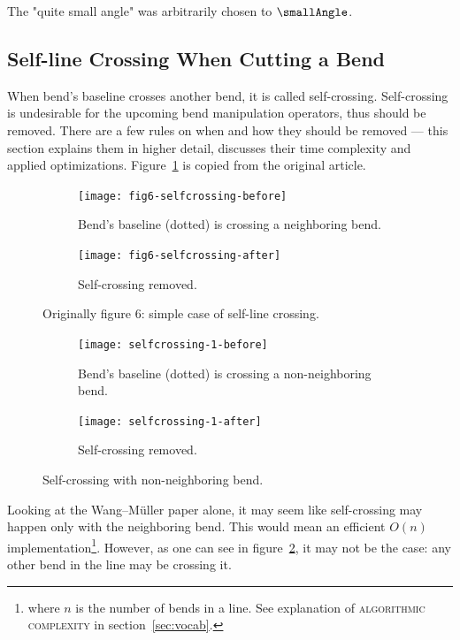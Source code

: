 \documentclass[a4paper]{article}
\newcommand{\WM}{Wang--M{\"u}ller}
\begin{document}
The "quite small angle" was arbitrarily chosen to $\smallAngle$.

\subsection{Self-line Crossing When Cutting a Bend}

When bend's baseline crosses another bend, it is called self-crossing.
Self-crossing is undesirable for the upcoming bend manipulation operators, thus
should be removed. There are a few rules on when and how they should be removed
--- this section explains them in higher detail, discusses their time
complexity and applied optimizations. Figure~\ref{fig:fig6-selfcrossing} is
copied from the original article.

\begin{figure}[h]
    \centering
    \begin{subfigure}[b]{.49\textwidth}
        \texttt{[image: fig6-selfcrossing-before]}
        \caption{Bend's baseline (dotted) is crossing a neighboring bend.}
    \end{subfigure}
    \hfill
    \begin{subfigure}[b]{.49\textwidth}
        \texttt{[image: fig6-selfcrossing-after]}
        \caption{Self-crossing removed.}
    \end{subfigure}
    \caption{Originally figure 6: simple case of self-line crossing.}
    \label{fig:fig6-selfcrossing}
\end{figure}

\begin{figure}[h]
    \centering
    \begin{subfigure}[b]{.49\textwidth}
        \texttt{[image: selfcrossing-1-before]}
        \caption{Bend's baseline (dotted) is crossing a non-neighboring bend.}
    \end{subfigure}
    \hfill
    \begin{subfigure}[b]{.49\textwidth}
        \texttt{[image: selfcrossing-1-after]}
        \caption{Self-crossing removed.}
    \end{subfigure}
    \caption{Self-crossing with non-neighboring bend.}
    \label{fig:selfcrossing-1-non-neighbor}
\end{figure}

Looking at the {\WM} paper alone, it may seem like self-crossing may happen
only with the neighboring bend. This would mean an efficient $O(n)$
implementation\footnote{where $n$ is the number of bends in a line. See
explanation of \textsc{algorithmic complexity} in section~\ref{sec:vocab}.}.
However, as one can see in figure~\ref{fig:selfcrossing-1-non-neighbor}, it may
not be the case: any other bend in the line may be crossing it.
\end{document}
